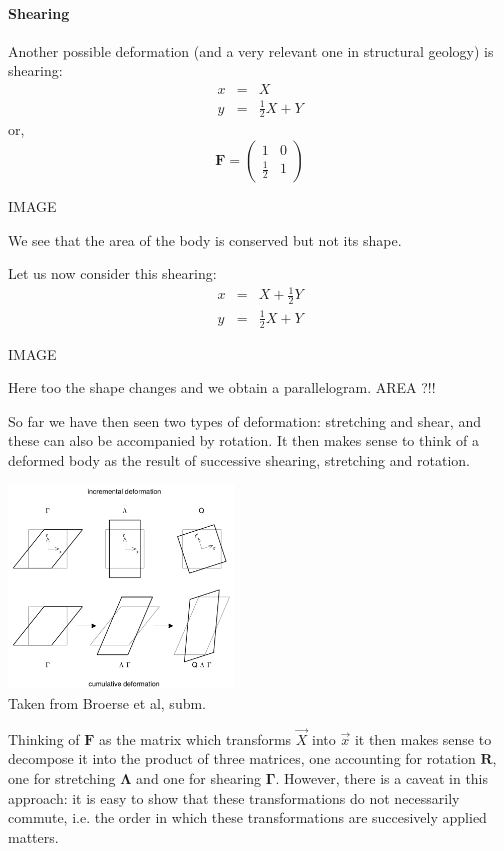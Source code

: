 \paragraph{Shearing} Another possible deformation (and a very relevant one 
in structural geology) is shearing:
\begin{eqnarray}
x &=& X   \\
y &=& \frac12 X + Y 
\end{eqnarray}
or, 
\begin{equation}
{\bm F} = 
\left(
\begin{array}{cc}
1 & 0 \\
\frac12 & 1
\end{array}
\right)
\label{eq:shearing1}
\end{equation}

IMAGE

We see that the area of the body is conserved but not its shape.

Let us now consider this shearing:
\begin{eqnarray}
x &=& X + \frac12 Y  \\
y &=& \frac12 X + Y 
\end{eqnarray}

IMAGE

Here too the shape changes and we obtain a parallelogram. AREA ?!!

So far we have then seen two types of deformation: stretching and shear, and these
can also be accompanied by rotation. 
It then makes sense to think of a deformed body as the result of successive 
shearing, stretching and rotation. 


\begin{center}
\includegraphics[width=6cm]{python_codes/fieldstone_89/images/broerse}\\
{\captionfont Taken from Broerse et al, subm.}
\end{center}


Thinking of ${\bm F}$ as the matrix which transforms $\vec{X}$ into $\vec{x}$
it then makes sense to decompose it into the product of three matrices, 
one accounting for rotation ${\bm R}$, one for stretching ${\bm \Lambda}$ and
one for shearing ${\bm \Gamma}$.
However, there is a caveat in this approach: it is easy to show that 
these transformations do not necessarily commute, i.e. the order in which 
these transformations are succesively applied matters.  

